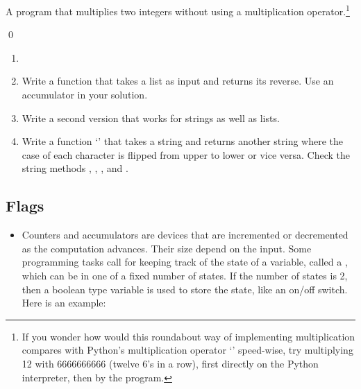 \documentclass[a4paper]{article}
\begin{document}
{\begin{itemize}
\begin{ucode}[Multiplication]
A program that multiplies two integers without using a multiplication
operator.\footnote{If you wonder how would this roundabout way of implementing multiplication
compares with Python's multiplication operator `\pyv{*}' speed-wise, try
multiplying 12 with 6666666666 (twelve 6's in a row), first directly on the
Python interpreter, then by the program.}

\begin{ucodeframe}
\end{ucodeframe}
\qed
\end{ucode}

\begin{uexercise}
\begin{enumerate}
\item[]
\item
Write a function that takes a list as input and returns its reverse. Use
an accumulator in your solution.
\item
Write a second version that works for strings as well as lists.
\item Write a function `' that takes a string and returns another
string where the case of each character is flipped from upper to lower or vice
versa. Check the string methods , , ,
and
.
\end{enumerate}
\end{uexercise}


\end{itemize}


\subsection{Flags} 

\begin{itemize}

\item Counters and accumulators are devices that are incremented or decremented
as the computation advances. Their size depend on the input. Some programming
tasks call for keeping track of the state of a variable, called
 a ,  which can be in one of
a fixed number of states. If
the number of states is 2, then a boolean type variable is used to store the
state, like an on/off switch. Here is an example:

\begin{ucode}


\end{ucode}
\end{itemize}}
\end{document}
